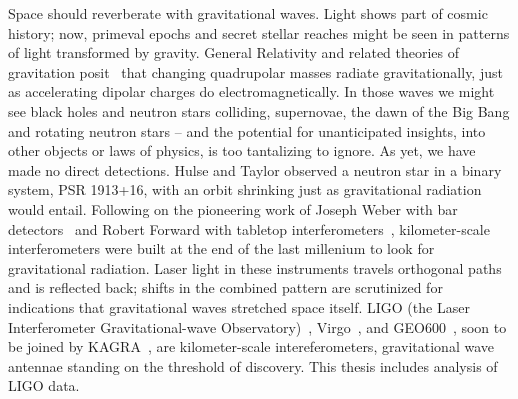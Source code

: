 



        Space should reverberate with gravitational waves. 
Light shows part of cosmic history; now, primeval epochs and secret stellar reaches might be seen in patterns of light transformed by gravity. 
General Relativity and related theories of gravitation posit~\cite{EinsteinRosen1937} that changing quadrupolar masses radiate gravitationally, just as accelerating dipolar charges do electromagnetically. 
In those waves we might see black holes and neutron stars colliding, supernovae, the dawn of the Big Bang and rotating neutron stars -- and the potential for unanticipated insights, into other objects or laws of physics, is too tantalizing to ignore. 
As yet, we have made no direct detections. 
Hulse and Taylor \cite{HulseTaylor1975} observed a neutron star in a binary system, PSR 1913+16, with an orbit shrinking just as gravitational radiation would entail. 
Following on the pioneering work of Joseph Weber with bar detectors~\cite{Weber1960} and Robert Forward with tabletop interferometers~\cite{Forward1978}, kilometer-scale interferometers were built at the end of the last millenium to look for gravitational radiation. 
Laser light in these instruments travels orthogonal paths and is reflected back; shifts in the combined pattern are scrutinized for indications that gravitational waves stretched space itself. 
LIGO (the Laser Interferometer Gravitational-wave Observatory)~\cite{LIGOFirst2004,Fricke2009}, Virgo~\cite{Acernese2005}, and GEO600~\cite{Willke2002,Hild2009}, soon to be joined by KAGRA~\cite{Kuroda2010}, are kilometer-scale intereferometers, gravitational wave antennae standing on the threshold of discovery.
This thesis includes analysis of LIGO data.

